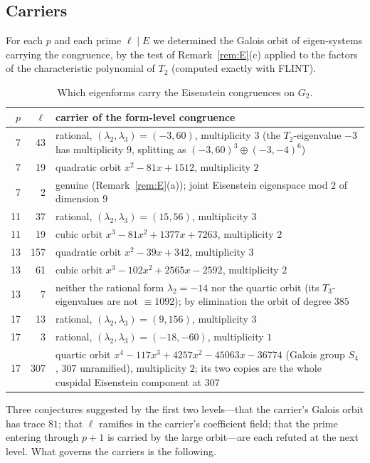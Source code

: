 \documentclass[11pt]{amsart}
\theoremstyle{definition}
\begin{document}
\subsection{Carriers} For each $p$ and each prime $\ell\mid E$ we determined the Galois orbit of eigen-systems carrying the congruence, by the test of Remark~\ref{rem:E}(c) applied to the factors of the characteristic polynomial of $T_2$ (computed exactly with FLINT).
\begin{table}[h]\centering\small
\begin{tabular}{@{}rrp{9.2cm}@{}}\toprule
$p$ & $\ell$ & carrier of the form-level congruence\\\midrule
7 & 43 & rational, $(\lambda_2,\lambda_3)=(-3,60)$, multiplicity $3$ (the $T_2$-eigenvalue $-3$ has multiplicity $9$, splitting as $(-3,60)^{3}\oplus(-3,-4)^{6}$)\\
7 & 19 & quadratic orbit $x^2-81x+1512$, multiplicity $2$\\
7 & 2 & genuine (Remark~\ref{rem:E}(a)); joint Eisenstein eigenspace mod $2$ of dimension $9$\\
11 & 37 & rational, $(\lambda_2,\lambda_3)=(15,56)$, multiplicity $3$\\
11 & 19 & cubic orbit $x^3-81x^2+1377x+7263$, multiplicity $2$\\
13 & 157 & quadratic orbit $x^2-39x+342$, multiplicity $3$\\
13 & 61 & cubic orbit $x^3-102x^2+2565x-2592$, multiplicity $2$\\
13 & 7 & neither the rational form $\lambda_2=-14$ nor the quartic orbit (its $T_3$-eigenvalues are not $\equiv1092$); by elimination the orbit of degree $385$\\
17 & 13 & rational, $(\lambda_2,\lambda_3)=(9,156)$, multiplicity $3$\\
17 & 3 & rational, $(\lambda_2,\lambda_3)=(-18,-60)$, multiplicity $1$\\
17 & 307 & quartic orbit $x^4-117x^3+4257x^2-45063x-36774$ (Galois group $S_4$, $307$ unramified), multiplicity $2$; its two copies are the whole cuspidal Eisenstein component at $307$\\\bottomrule
\end{tabular}
\caption{Which eigenforms carry the Eisenstein congruences on $G_2$.}
\end{table}
Three conjectures suggested by the first two levels---that the carrier's Galois orbit has trace $81$; that $\ell$ ramifies in the carrier's coefficient field; that the prime entering through $p+1$ is carried by the large orbit---are each refuted at the next level. What governs the carriers is the following.
\end{document}
